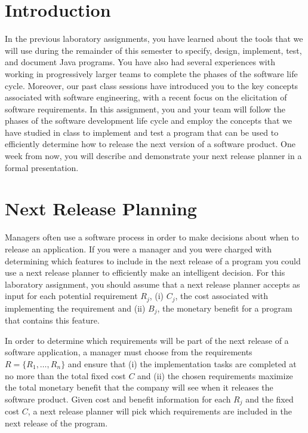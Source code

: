 

\usepackage[compact]{titlesec}



\section*{Introduction}

In the previous laboratory assignments, you have learned about the tools that we will use during the remainder of this semester to
specify, design, implement, test, and document Java programs.  You have also had several experiences with working in
progressively larger teams to complete the phases of the software life cycle.  Moreover, our past class sessions have
introduced you to the key concepts associated with software engineering, with a recent focus on the elicitation of
software requirements.  In this assignment, you and your team will follow the phases of the software development life
cycle and employ the concepts that we have studied in class to implement and test a program that can be used to
efficiently determine how to release the next version of a software product. One week from now, you will describe and
demonstrate your next release planner in a formal presentation.

\section*{Next Release Planning}

Managers often use a software process in order to make decisions about when to release an application.  If you were a
manager and you were charged with determining which features to include in the next release of a program you could
use a next release planner to efficiently make an intelligent decision.  For this laboratory assignment, you should
assume that a next release planner accepts as input for each potential requirement $R_j$, (i) $C_j$, the cost associated with
implementing the requirement and (ii) $B_j$, the monetary benefit for a program that contains this feature.

In order to determine which requirements will be part of the next release of a software application, a manager must
choose from the requirements $R = \{ R_1, \ldots, R_n \}$ and ensure that (i) the implementation tasks are completed at
no more than the total fixed cost $C$ and (ii) the chosen requirements maximize the total monetary benefit that the
company will see when it releases the software product.  Given cost and benefit information for each $R_j$ and the fixed
cost $C$, a next release planner will pick which requirements are included in the next release of the program.

